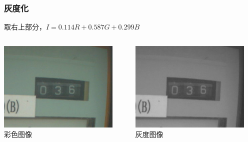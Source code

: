 \documentclass[12pt,hyperref={CJKbookmarks=true}]{beamer}
\begin{document}
\begin{frame}
  \frametitle{灰度化}  
  \begin{center}
    取右上部分，$I=0.114R+0.587G+0.299B$
  \end{center}
  \begin{columns}[onlytextwidth]
    \begin{column}{0.5\textwidth}
      \centering
      \includegraphics[width=0.9\textwidth]{rgb.png}\\
      \footnotesize 彩色图像
    \end{column}
    \begin{column}{0.5\textwidth}
      \centering
      \includegraphics[width=0.9\textwidth]{gray.png}\\
      \footnotesize 灰度图像
    \end{column}
  \end{columns}
\end{frame}
\end{document}
